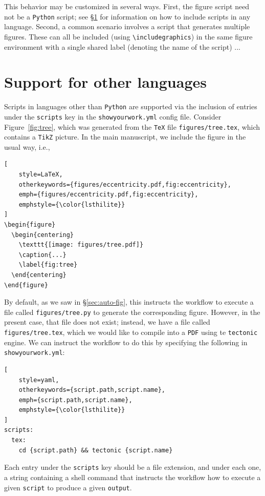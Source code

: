 \documentclass[twocolumn]{aastex631}
\begin{document}
This behavior may be customized in several ways. 
First, the figure script need not be a \texttt{Python} script; see \S\ref{sec:other-lang} for information on how to include scripts in any language.
Second, a common scenario involves a script that generates multiple figures.
These can all be included (using \texttt{{\textbackslash}includegraphics}) in the same figure environment with a single shared label (denoting the name of the script)
...

\section{Support for other languages}
\label{sec:other-lang}
%
Scripts in languages other than \texttt{Python} are supported via the inclusion of entries under the \texttt{scripts} key in the \texttt{showyourwork.yml} config file. 
Consider Figure~\ref{fig:tree}, which was generated from the \texttt{TeX} file \texttt{figures/tree.tex}, which contains a \texttt{TikZ} picture. 
In the main manuscript, we include the figure in the usual way, i.e.,
%
\begin{lstlisting}[
    style=LaTeX,
    otherkeywords={figures/eccentricity.pdf,fig:eccentricity},
    emph={figures/eccentricity.pdf,fig:eccentricity},
    emphstyle={\color{lsthilite}}
]
\begin{figure}
  \begin{centering}
    \texttt{[image: figures/tree.pdf]}
    \caption{...}
    \label{fig:tree}
  \end{centering}
\end{figure}
\end{lstlisting}
%
By default, as we saw in \S\ref{sec:auto-fig}, this instructs the workflow to execute a file called \texttt{figures/tree.py} to generate the corresponding figure. 
However, in the present case, that file does not exist; instead, we have a file called \texttt{figures/tree.tex}, which we would like to compile into a \texttt{PDF} using te \texttt{tectonic} engine.
We can instruct the workflow to do this by specifying the following in \texttt{showyourwork.yml}:
%
\begin{lstlisting}[
    style=yaml,
    otherkeywords={script.path,script.name},
    emph={script.path,script.name},
    emphstyle={\color{lsthilite}}
]
scripts:
  tex:
    cd {script.path} && tectonic {script.name}
\end{lstlisting}
%
Each entry under the \texttt{scripts} key should be a file extension, and under each one, a string containing a shell command that instructs the workflow how to execute a given {\color{lsthilite}\texttt{script}} to produce a given {\color{lsthilite}\texttt{output}}.
\end{document}
